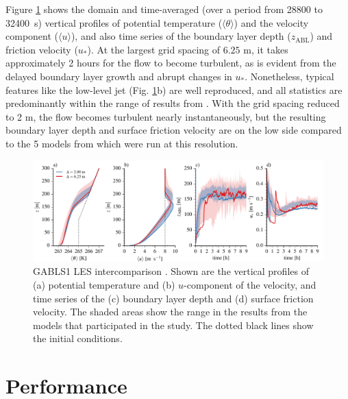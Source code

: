 \documentclass[gmd,manuscript]{copernicus}
\begin{document}
Figure \ref{fig:gabls} shows the domain and time-averaged (over a period from 28800 to 32400~s) vertical profiles of potential temperature ($\langle \theta \rangle$) and the velocity component ($\langle u \rangle$), and also time series of the boundary layer depth ($z_\mathrm{ABL}$) and friction velocity ($u_*$). At the largest grid spacing of $6.25$ m, it takes approximately 2 hours for the flow to become turbulent, as is evident from the delayed boundary layer growth and abrupt changes in $u_*$. Nonetheless, typical features like the low-level jet (Fig. \ref{fig:gabls}b) are well reproduced, and all statistics are predominantly within the range of results from \cite{Beare2006}. With the grid spacing reduced to 2 m, the flow becomes turbulent nearly instantaneously, but the resulting boundary layer depth and surface friction velocity are on the low side compared to the 5 models from \cite{Beare2006} which were run at this resolution. 

\begin{figure}[t]
\vspace*{2mm}
\begin{center}
\includegraphics[width=16.6cm]{figs/gmd_gabls_prof_tser.pdf}
\end{center}
\caption{GABLS1 LES intercomparison \citep{Beare2006}. Shown are the vertical profiles of (a) potential temperature and (b) $u$-component of the velocity, and time series of the (c) boundary layer depth and (d) surface friction velocity. The shaded areas show the range in the results from the models that participated in the \citet{Beare2006} study. The dotted black lines show the initial conditions.}
\label{fig:gabls}
\end{figure}

\section{Performance}\label{sec:performance}
\end{document}
